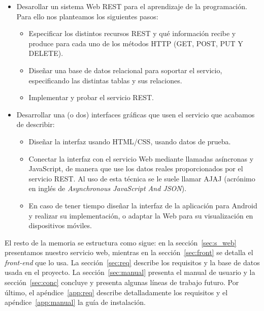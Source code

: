 \begin{itemize}
\item
Desarollar un sistema Web REST para el aprendizaje de la programación. Para ello nos planteamos los siguientes pasos:

\begin{itemize}
\item
Especificar los distintos recursos REST y qué información recibe y produce para cada uno de los métodos HTTP (GET, POST, PUT Y DELETE).

\item
Diseñar una base de datos relacional para soportar el servicio, especificando las distintas tablas y sus relaciones.

\item
Implementar y probar el servicio REST.

\end{itemize}

\item
Desarrollar una (o dos) interfaces gráficas que usen el servicio que acabamos de describir:

\begin{itemize}
\item
Diseñar la interfaz usando HTML/CSS, usando datos de prueba.

\item
Conectar la interfaz con el servicio Web mediante llamadas asíncronas y JavaScript, de manera que use los datos reales proporcionados por el servicio REST. Al uso de esta técnica se le suele llamar AJAJ (acrónimo en inglés de  \emph{Asynchronous JavaScript And JSON}).

\item
En caso de tener tiempo diseñar la interfaz de la aplicación para Android y realizar su implementación, o adaptar la Web para su visualización en dispositivos móviles.

\end{itemize}

\end{itemize}

El resto de la memoria se estructura como sigue: en la sección~\ref{sec:s_web} presentamos nuestro
servicio web, mientras en la sección~\ref{sec:front} se detalla el \emph{front-end} que lo usa.
La sección~\ref{sec:req} describe los requisitos y la base de datos usada en el proyecto. La
sección~\ref{sec:manual} presenta el manual de usuario y la sección~\ref{sec:conc} concluye y
presenta algunas líneas de trabajo futuro.
Por último, el apéndice~\ref{app:req} describe detalladamente los requisitos y el
apéndice~\ref{app:manual} la guía de instalación.

